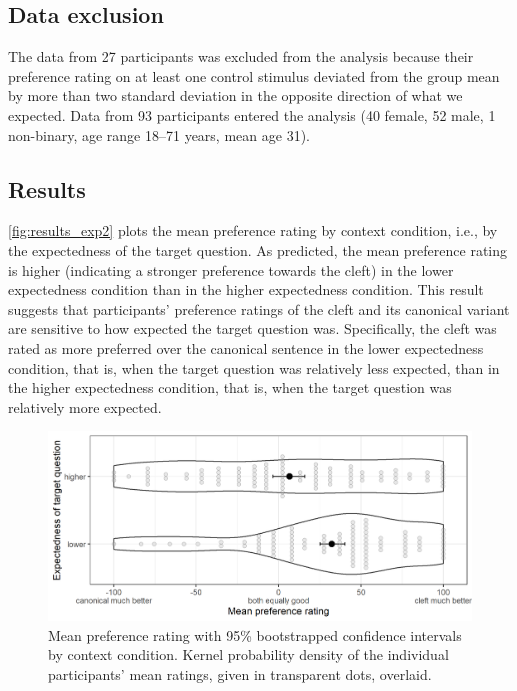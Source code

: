 \documentclass{salt}
\begin{document}
\subsection{Data exclusion} 

The data from 27 participants was excluded from the analysis because their preference rating on at least one control stimulus deviated from the group mean by more than two standard deviation in the opposite direction of what we expected. Data from 93 participants entered the analysis (40 female, 52 male, 1 non-binary, age range 18--71 years, mean age 31).

\subsection{Results}

\autoref{fig:results_exp2} plots the mean preference rating by context condition, i.e., by the expectedness of the target question. As predicted, the mean preference rating is higher (indicating a stronger preference towards the cleft) in the lower expectedness condition than in the higher expectedness condition. This result suggests that participants' preference ratings of the cleft and its canonical variant are sensitive to how expected the target question was. Specifically, the cleft was rated as more preferred over the canonical sentence in the lower expectedness condition, that is, when the target question was relatively less expected, than in the higher expectedness condition, that is, when the target question was relatively more expected.

\begin{figure}[]
\caption{Mean preference rating with 95\% bootstrapped confidence intervals by context condition. Kernel probability density of the individual participants' mean ratings, given in transparent dots, overlaid.}
\begin{center}
\includegraphics[width=1\textwidth]{results_main_experiment.png}
\end{center}
\label{fig:results_exp2}
\end{figure}
\end{document}
